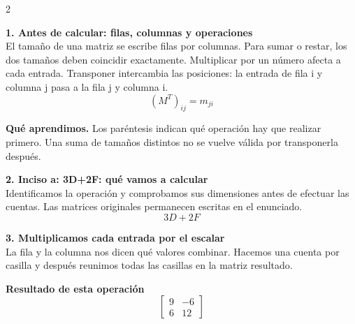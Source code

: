 \documentclass[11pt,a4paper,landscape]{article}
\begin{document}
\begin{multicols*}{2}
\noindent\begin{minipage}{\linewidth}\textbf{1. Antes de calcular: filas, columnas y operaciones}\\[2pt]El tamaño de una matriz se escribe filas por columnas. Para sumar o restar, los dos tamaños deben coincidir exactamente. Multiplicar por un número afecta a cada entrada. Transponer intercambia las posiciones: la entrada de fila i y columna j pasa a la fila j y columna i.
\[(M^T)_{ij}=m_{ji}\]
\par\smallskip\textbf{Qué aprendimos.} Los paréntesis indican qué operación hay que realizar primero. Una suma de tamaños distintos no se vuelve válida por transponerla después.
\end{minipage}\par\medskip
\noindent\begin{minipage}{\linewidth}\textbf{2. Inciso a: 3D+2F: qué vamos a calcular}\\[2pt]Identificamos la operación y comprobamos sus dimensiones antes de efectuar las cuentas. Las matrices originales permanecen escritas en el enunciado.
\[3D+2F\]
\end{minipage}\par\medskip
\noindent\begin{minipage}{\linewidth}\textbf{3. Multiplicamos cada entrada por el escalar}\\[2pt]La fila y la columna nos dicen qué valores combinar. Hacemos una cuenta por casilla y después reunimos todas las casillas en la matriz resultado.
\par{}\par\smallskip
\par\smallskip \textbf{Resultado de esta operación}\[\begin{bmatrix}9 & -6\\6 & 12\end{bmatrix}\]

\end{minipage}
\end{multicols*}
\end{document}
